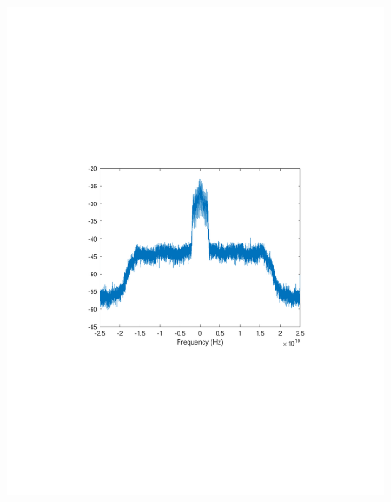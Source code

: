 \begin{refsection}
\begin{figure}[H]
	\centering
	\begin{minipage}{0.30\textwidth}
		\centering
		\includegraphics[clip, trim=4cm 8cm 4cm 8cm, width=1\textwidth]{./sdf/m_qam_system/figures/expResults/homodyne/1_4GBdInSig13dB_AfFec.pdf}
		\label{fig:4GBdEyeAftFec}
	\end{minipage}
	\begin{minipage}{0.30\textwidth}
		\centering

\end{minipage}
\end{figure}
\end{refsection}
